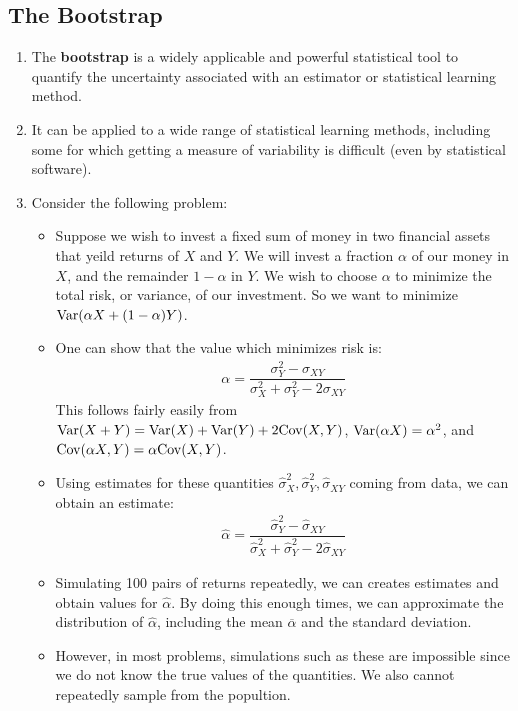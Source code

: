 \documentclass[10pt]{article}
\newcommand{\Var}{{\rm Var}}
\newcommand{\Cov}{{\rm Cov}}
\begin{document}
\subsection{The Bootstrap} 
\begin{enumerate}
	\item The \textbf{bootstrap} is a widely applicable and powerful statistical tool to quantify the uncertainty associated with an estimator or statistical learning method.
	\item It can be applied to a wide range of statistical learning methods, including some for which getting a measure of variability is difficult (even by statistical software).
	\item Consider the following problem: \begin{itemize}
		\item Suppose we wish to invest a fixed sum of money in two financial assets that yeild returns of $X$ and $Y$.  We will invest a fraction $\alpha$ of our money in $X$, and the remainder $1 - \alpha$ in $Y$.  We wish to choose $\alpha$ to minimize the total risk, or variance, of our investment.  So we want to minimize $\Var(\alpha X + (1 - \alpha)Y)$.
		\item One can show that the value which minimizes risk is:
		\begin{align*}
			\alpha = \dfrac{\sigma_Y^2 - \sigma_{XY}}{\sigma_X^2 + \sigma_Y^2 - 2 \sigma_{XY}}
		\end{align*}
		{\color{brown} This follows fairly easily from $\Var(X + Y) = \Var(X) + \Var(Y) + 2\Cov(X,Y)$, $\Var(\alpha X) = \alpha^2$, and $\Cov(\alpha X, Y) = \alpha \Cov(X,Y)$.}
		\item Using estimates for these quantities $\hat \sigma_X^2, \hat \sigma_Y^2, \hat \sigma_{XY}$ coming from data, we can obtain an estimate:
		\begin{align*}
			\hat \alpha = \dfrac{\hat \sigma_Y^2 - \hat \sigma_{XY}}{\hat \sigma_X^2 + \hat \sigma_Y^2 - 2 \hat\sigma_{XY}}
		\end{align*}
		\item Simulating 100 pairs of returns repeatedly, we can creates estimates and obtain values for $\hat \alpha$.  By doing this enough times, we can approximate the distribution of $\hat \alpha$, including the mean $\overline{\alpha}$ and the standard deviation.
		\item However, in most problems, simulations such as these are impossible since we do not know the true values of the quantities.  We also cannot repeatedly sample from the popultion.

\end{itemize}
\end{enumerate}
\end{document}
